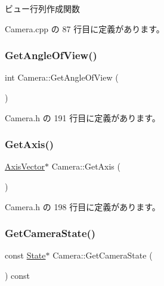 ビュー行列作成関数 



 Camera.\+cpp の 87 行目に定義があります。

\mbox{\label{class_camera_a9d54f574c141e6007d98ccd905501632}} 
\subsubsection{\texorpdfstring{Get\+Angle\+Of\+View()}{GetAngleOfView()}}
{\footnotesize\ttfamily int Camera\+::\+Get\+Angle\+Of\+View (\begin{DoxyParamCaption}{ }\end{DoxyParamCaption})\hspace{0.3cm}{\ttfamily [inline]}}



 Camera.\+h の 191 行目に定義があります。

\mbox{\label{class_camera_a62c4371143e87e34c70d27f2728987d9}} 
\subsubsection{\texorpdfstring{Get\+Axis()}{GetAxis()}}
{\footnotesize\ttfamily \mbox{\hyperlink{class_axis_vector}{Axis\+Vector}}$\ast$ Camera\+::\+Get\+Axis (\begin{DoxyParamCaption}{ }\end{DoxyParamCaption})\hspace{0.3cm}{\ttfamily [inline]}}



 Camera.\+h の 198 行目に定義があります。

\mbox{\label{class_camera_a47e72bd04f7aaac1657d7bce5322b97c}} 
\subsubsection{\texorpdfstring{Get\+Camera\+State()}{GetCameraState()}}
{\footnotesize\ttfamily const \mbox{\hyperlink{class_camera_1_1_state}{State}}$\ast$ Camera\+::\+Get\+Camera\+State (\begin{DoxyParamCaption}{ }\end{DoxyParamCaption}) const\hspace{0.3cm}{\ttfamily [inline]}}



